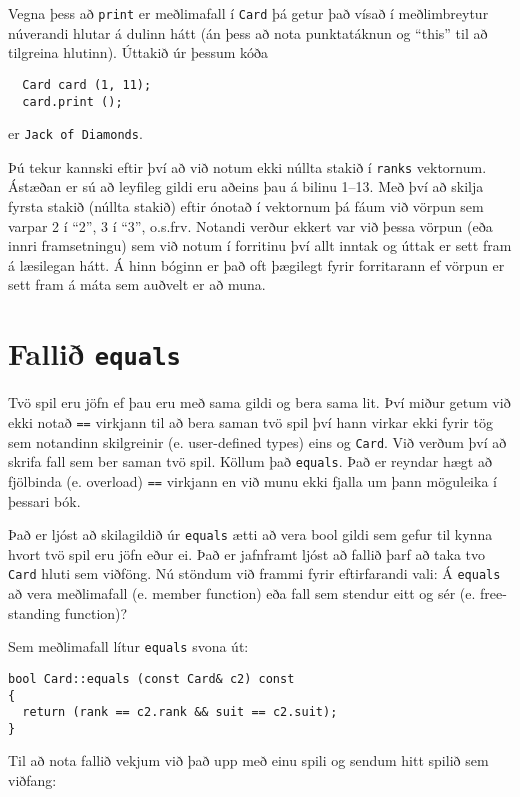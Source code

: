 Vegna þess að {\tt print} er meðlimafall í {\tt Card} þá getur það vísað í meðlimbreytur núverandi hlutar á dulinn hátt (án þess að nota punktatáknun og ``this'' til að tilgreina hlutinn).
Úttakið úr þessum kóða

\begin{verbatim}
  Card card (1, 11);
  card.print ();
\end{verbatim}
%
er {\tt Jack of Diamonds}.

Þú tekur kannski eftir því að við notum ekki núllta stakið í {\tt ranks} vektornum.
Ástæðan er sú að leyfileg gildi eru aðeins þau á bilinu 1--13.
Með því að skilja fyrsta stakið (núllta stakið) eftir ónotað í vektornum þá fáum við vörpun sem varpar 2 í ``2'', 3 í ``3'', o.s.frv.
Notandi verður ekkert var við þessa vörpun (eða innri framsetningu) sem við notum í forritinu því allt inntak og úttak er sett fram á læsilegan hátt.
Á hinn bóginn er það oft þægilegt fyrir forritarann ef vörpun er sett fram á máta sem auðvelt er að muna.

\section{Fallið {\tt equals}}

Tvö spil eru jöfn ef þau eru með sama gildi og bera sama lit.
Því miður getum við ekki notað {\tt ==} virkjann til að bera saman tvö spil
því hann virkar ekki fyrir tög sem notandinn skilgreinir (e. user-defined types) eins og {\tt Card}.
Við verðum því að skrifa fall sem ber saman tvö spil.
Köllum það {\tt equals}.
Það er reyndar hægt að fjölbinda (e. overload) {\tt ==} virkjann en við munu ekki fjalla um þann möguleika í þessari bók. 

Það er ljóst að skilagildið úr {\tt equals} ætti að vera bool gildi sem gefur til kynna hvort tvö spil eru jöfn eður ei.
Það er jafnframt ljóst að fallið þarf að taka tvo {\tt Card} hluti sem viðföng. 
Nú stöndum við frammi fyrir eftirfarandi vali: Á {\tt equals} að vera meðlimafall (e. member function) eða fall sem stendur eitt og sér (e. free-standing function)?

Sem meðlimafall lítur {\tt equals} svona út:

\begin{verbatim}
bool Card::equals (const Card& c2) const
{
  return (rank == c2.rank && suit == c2.suit);
}
\end{verbatim}
%
Til að nota fallið vekjum við það upp með einu spili og sendum hitt spilið sem viðfang: 

